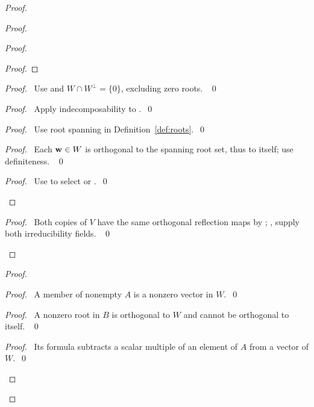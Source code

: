 \begin{proof}
\begin{proof}
\begin{proof}
\begin{proof}
\end{proof}
\begin{proof}\pf\ Use  and
$W\cap W^\perp=\{0\}$, excluding zero roots. ~\qed\end{proof}
\begin{proof}\pf\ Apply indecomposability to .~\qed\end{proof}
\begin{proof}\pf\ Use root spanning in Definition~\ref{def:roots}.~\qed\end{proof}
\begin{proof}\pf\ Each ${\mathbf w}\in W$ is orthogonal to the spanning root
set, thus to itself; use definiteness. ~\qed\end{proof}
\qedstep
\begin{proof}\pf\ Use  to select
 or .~\qed\end{proof}
\end{proof}
\qedstep
\begin{proof}\pf\ Both copies of $V$ have the same orthogonal reflection
maps by ; ,
 supply both irreducibility fields. ~\qed\end{proof}
\end{proof}
\begin{proof}
\begin{proof}\pf\ A member of nonempty $A$ is a nonzero vector in $W$.~\qed\end{proof}
\begin{proof}\pf\ A nonzero root in $B$ is orthogonal to $W$ and
cannot be orthogonal to itself. ~\qed\end{proof}
\begin{proof}\pf\ Its formula subtracts a scalar multiple of an element
of $A$ from a vector of $W$.~\qed\end{proof}

\end{proof}
\end{proof}
